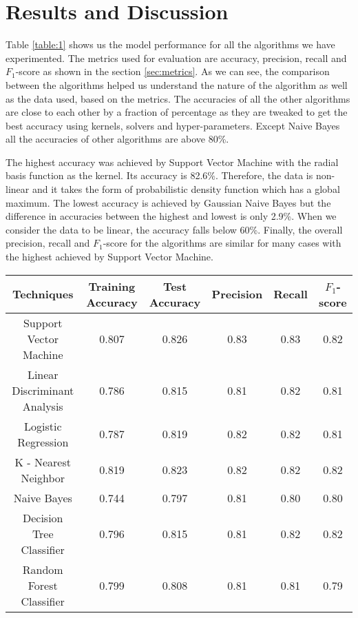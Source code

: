 \documentclass[conference]{IEEEtran}
\begin{document}
\section{Results and Discussion}
Table \ref{table:1} shows us the model performance for all the algorithms we have experimented. The metrics used for evaluation are accuracy, precision, recall and $F_1$-score as shown in the section \ref{sec:metrics}. As we can see, the comparison between the algorithms helped us understand the nature of the algorithm as well as the data used, based on the metrics. The accuracies of all the other algorithms are close to each other by a fraction of percentage as they are tweaked to get the best accuracy using kernels, solvers and hyper-parameters. Except Naive Bayes all the accuracies of other algorithms are above 80\%. 
\par
The highest accuracy was achieved by Support Vector Machine with the radial basis function as the kernel. Its accuracy is 82.6\%. Therefore, the data is non-linear and it takes the form of probabilistic density function which has a global maximum. The lowest accuracy is achieved by Gaussian Naive Bayes but the difference in accuracies between the highest and lowest is only 2.9\%. When we consider the data to be linear, the accuracy falls below 60\%. Finally, the overall precision, recall and $F_1$-score for the algorithms are similar for many cases with the highest achieved by Support Vector Machine.
\par

\begin{table*}[htb]
\centering
 \begin{tabular}{|c| c c c c c|} 
 \hline
 Techniques & Training 		Accuracy & Test 	Accuracy & Precision & Recall & $F_1$-score \\ [0.5ex] 
 \hline
 Support Vector Machine & 0.807 & 0.826 & 0.83 & 0.83 & 0.82\\ 
 \hline
 Linear Discriminant Analysis & 0.786 & 0.815 & 0.81 & 0.82 & 0.81\\
 \hline
 Logistic Regression & 0.787 & 0.819 & 0.82 & 0.82 & 0.81\\
 \hline
 K - Nearest Neighbor & 0.819 & 0.823 & 0.82 & 0.82 & 0.82\\
 \hline
 Naive Bayes & 0.744 & 0.797 & 0.81 & 0.80 & 0.80\\  
 \hline
 Decision Tree Classifier & 0.796 & 0.815 & 0.81 & 0.82 & 0.82 \\
 \hline
 Random Forest Classifier & 0.799 & 0.808 & 0.81 & 0.81 & 0.79 \\[0.5ex] 
 \hline
\end{tabular}
\vspace*{0.25cm}
\caption{Model Performance of Algorithms}
\label{table:1}
\end{table*}
\end{document}
